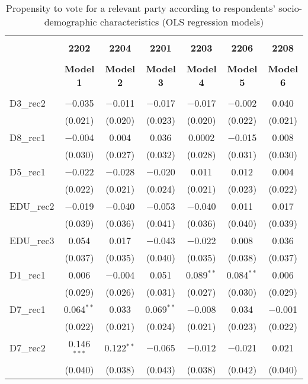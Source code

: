 \documentclass[
]{article}
\begin{document}
\begin{table}[!htbp] \centering 
  \caption{Propensity to vote for a relevant party according to respondents' 
                     socio-demographic characteristics (OLS regression models)} 
  \label{table:full_ols_pt} 
\begin{tabular}{@{\extracolsep{5pt}}lcccccc} 
\\[-1.8ex]\hline \\[-1.8ex] 
 & \textbf{2202} & \textbf{2204} & \textbf{2201} & \textbf{2203} & \textbf{2206} & \textbf{2208} \\ 
\\[-1.8ex] & \textbf{Model 1} & \textbf{Model 2} & \textbf{Model 3} & \textbf{Model 4} & \textbf{Model 5} & \textbf{Model 6}\\ 
\hline \\[-1.8ex] 
 D3\_rec2 & $-$0.035 & $-$0.011 & $-$0.017 & $-$0.017 & $-$0.002 & 0.040 \\ 
  & (0.021) & (0.020) & (0.023) & (0.020) & (0.022) & (0.021) \\ 
  D8\_rec1 & $-$0.004 & 0.004 & 0.036 & 0.0002 & $-$0.015 & 0.008 \\ 
  & (0.030) & (0.027) & (0.032) & (0.028) & (0.031) & (0.030) \\ 
  D5\_rec1 & $-$0.022 & $-$0.028 & $-$0.020 & 0.011 & 0.012 & 0.004 \\ 
  & (0.022) & (0.021) & (0.024) & (0.021) & (0.023) & (0.022) \\ 
  EDU\_rec2 & $-$0.019 & $-$0.040 & $-$0.053 & $-$0.040 & 0.011 & 0.017 \\ 
  & (0.039) & (0.036) & (0.041) & (0.036) & (0.040) & (0.039) \\ 
  EDU\_rec3 & 0.054 & 0.017 & $-$0.043 & $-$0.022 & 0.008 & 0.036 \\ 
  & (0.037) & (0.035) & (0.040) & (0.035) & (0.038) & (0.037) \\ 
  D1\_rec1 & 0.006 & $-$0.004 & 0.051 & 0.089$^{**}$ & 0.084$^{**}$ & 0.006 \\ 
  & (0.029) & (0.026) & (0.031) & (0.027) & (0.030) & (0.029) \\ 
  D7\_rec1 & 0.064$^{**}$ & 0.033 & 0.069$^{**}$ & $-$0.008 & 0.034 & $-$0.001 \\ 
  & (0.022) & (0.021) & (0.024) & (0.021) & (0.023) & (0.022) \\ 
  D7\_rec2 & 0.146$^{***}$ & 0.122$^{**}$ & $-$0.065 & $-$0.012 & $-$0.021 & 0.021 \\ 
  & (0.040) & (0.038) & (0.043) & (0.038) & (0.042) & (0.040) \\ 

\end{tabular}
\end{table}
\end{document}
